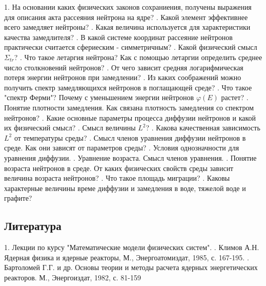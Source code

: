 \documentclass[a4paper]{article}
\begin{document}
    1. На основании каких физических законов сохраниения, получены
    выражения для описания акта рассеяния нейтрона на ядре?
    . Какой элемент эффективнее всего замедляет нейтроны?
    . Какая величина используется для характеристики качества
    замедлителя?
    . В какой системе координат рассеяние нейтронов практически
    считается сфериеским - симметричным?
    . Какой физический смысл $\Sigma_{tr}$?
    . Что такое летаргия нейтрона? Как с помощью летаргии определить
    среднее число столкновений нейтронов?
    . От чего зависит средняя логарифмическая потеря энергии
    нейтронов при замедлении?
    . Из каких соображений можно получить спектр замедляющихся
    нейтронов в поглащающей среде?
    . Что такое "спектр Ферми"? Почему с уменьшением энергии
    нейтронов $\varphi(E)$ растет?
    . Понятие плотности замедления. Как связана плотность замедления
    со спектром нейтронов?
    . Какие основные параметры процесса диффузии нейтронов и какой
    их физический смысл?
    . Смысл величины $L^2$?
    . Какова качественная зависимость $L^2$ от температуры среды?
    . Смысл членов уравнения диффузии нейтронов в среде. Как они
    зависят от параметров среды?
    . Условия однозначности для уравнения диффузии.
    . Уравнение возраста. Смысл членов уравнения.
    . Понятие возраста нейтронов в среде. От каких физических
    свойств среды зависит величина возраста нейтронов?
    . Что такое площадь миграции?
    . Каковы характерные величины време диффузии и замедления в
    воде, тяжелой воде и графите?

    \subsection{Литература}
    1. Лекции по курсу "Математические модели физических систем".
    . Климов А.Н. Ядерная физика и ядерные реакторы, М.,
    Энергоатомиздат, 1985, с. 167-195.
    . Бартоломей Г.Г. и др. Основы теории и методы расчета ядерных
    энергетических реакторов. М., Энергоиздат, 1982, с. 81-159
\end{document}
